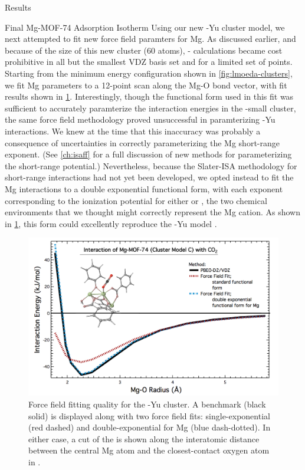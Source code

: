 \begin{section}{Results}
\begin{subsection}{Final Mg-MOF-74 {\co} Adsorption Isotherm}
Using our new \mgmof-Yu cluster model, we next attempted to fit new
force field paramters for Mg. As discussed earlier, and
because of the size of this new cluster (60 atoms), \lmoeda-\pbeod
calculations became cost prohibitive in all but the smallest VDZ basis set and
for a limited set of points. Starting from the minimum energy configuration
shown in \cref{fig:lmoeda-clusters}, we fit Mg parameters to a 12-point scan along the
Mg-O bond vector, with fit results shown in  
\cref{fig:lmoeda-xlarge_fit}. Interestingly, though the functional form used
in this fit was sufficient to accurately paramterize the interaction energies
in the \mgmof-small cluster, the same force field methodology proved
unsuccessful in paramterizing \mgmof-Yu interactions. We knew at the time that
this inaccuracy was probably a consequence of uncertainties in correctly
parameterizing the Mg short-range exponent. (See \cref{ch:isaff} for a full
discussion of new methods for parameterizing the short-range potential.) Nevertheless, because the Slater-ISA methodology
for short-range interactions had not yet been developed, we opted instead to
fit the Mg interactions to a double exponential functional form, with each
exponent corresponding to the ionization potential for either  or
, the two chemical environments that we thought might correctly
represent the Mg cation. As shown in \cref{fig:lmoeda-xlarge_fit}, this
form could excellently reproduce the \mgmof-Yu model \pes.


    \begin{figure}
    \centering
    \includegraphics[width=1.0\textwidth]{lmoeda/xlarge_ff_fit.pdf}
    \caption[Force field fitting quality for \mgmof-Yu]
{Force field fitting quality for the \mgmof-Yu cluster. A \pbeod benchmark
(black solid) is displayed along with two force field fits: single-exponential
(red dashed) and double-exponential for Mg (blue dash-dotted). In either case,
a cut of the \pes is shown along the interatomic distance between the central
Mg atom and the closest-contact oxygen atom in \co.
            }
    \label{fig:lmoeda-xlarge_fit}
    \end{figure}



\end{subsection}
\end{section}
